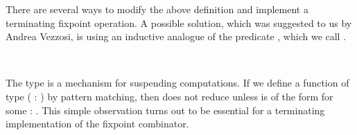 There are several ways to modify the above definition and implement a
terminating fixpoint operation. A possible solution, which was
suggested to us by Andrea Vezzosi, is using an inductive analogue of the predicate , which we call .
\begin{code}%
\>[0]\AgdaSpace{}%
\AgdaSpace{}%
\AgdaSymbol{(}\AgdaSpace{}%
\AgdaSymbol{:}\AgdaSpace{}%
\AgdaSymbol{)}\AgdaSpace{}%
\AgdaSymbol{:}\AgdaSpace{}%
\AgdaSpace{}%
\<%
\\
\>[0][@{}l@{\AgdaIndent{0}}]%
\>[2]\AgdaOperator{\AgdaInductiveConstructor{[\AgdaUnderscore{}]}}\AgdaSpace{}%
\AgdaSymbol{:}\AgdaSpace{}%
\AgdaSpace{}%
\AgdaSpace{}%
\AgdaSpace{}%
\AgdaSpace{}%
\<%
\end{code}

The type  is a mechanism for suspending computations.
If we define a function  of type ( :
 )    by pattern matching, then
 does not reduce unless  is of the form \IC{[} 
\IC{]} for some  :  . This simple observation
turns out to be essential for a terminating implementation of the
fixpoint combinator.


